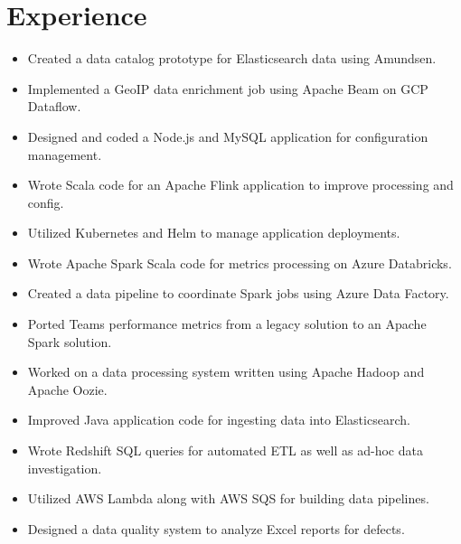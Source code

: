 \documentclass[letterpaper]{resume}
\begin{document}
\begin{minipage}[t]{0.72\columnwidth}


\section{Experience}

\vspace{2pt}
\begin{itemize}
\item Created a data catalog prototype for Elasticsearch data using Amundsen.
\item Implemented a GeoIP data enrichment job using Apache Beam on GCP Dataflow.
\item Designed and coded a Node.js and MySQL application for configuration management.
\item Wrote Scala code for an Apache Flink application to improve processing and config.
\item Utilized Kubernetes and Helm to manage application deployments.
\end{itemize}

\sectionspace

\vspace{2pt}
\begin{itemize}
\item Wrote Apache Spark Scala code for metrics processing on Azure Databricks.
\item Created a data pipeline to coordinate Spark jobs using Azure Data Factory.
\item Ported Teams performance metrics from a legacy solution to an Apache Spark solution.
\item Worked on a data processing system written using Apache Hadoop and Apache Oozie. 
\end{itemize}

\sectionspace

\vspace{2pt}
\begin{itemize}
\item Improved Java application code for ingesting data into Elasticsearch.
\item Wrote Redshift SQL queries for automated ETL as well as ad-hoc data investigation.
\item Utilized AWS Lambda along with AWS SQS for building data pipelines.
\item Designed a data quality system to analyze Excel reports for defects.
\end{itemize}


\end{minipage}
\end{document}
